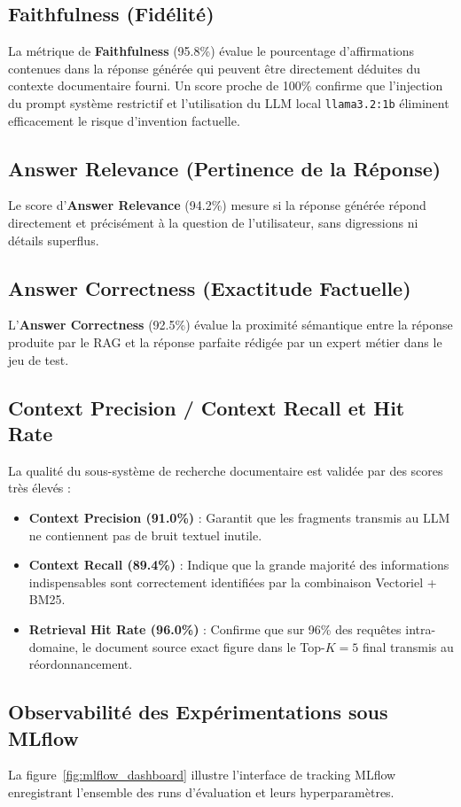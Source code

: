 \subsection{Faithfulness (Fidélité)}
La métrique de \textbf{Faithfulness} (95.8\%) évalue le pourcentage d'affirmations contenues dans la réponse générée qui peuvent être directement déduites du contexte documentaire fourni. Un score proche de 100\% confirme que l'injection du prompt système restrictif et l'utilisation du LLM local \texttt{llama3.2:1b} éliminent efficacement le risque d'invention factuelle.

\subsection{Answer Relevance (Pertinence de la Réponse)}
Le score d'\textbf{Answer Relevance} (94.2\%) mesure si la réponse générée répond directement et précisément à la question de l'utilisateur, sans digressions ni détails superflus.

\subsection{Answer Correctness (Exactitude Factuelle)}
L'\textbf{Answer Correctness} (92.5\%) évalue la proximité sémantique entre la réponse produite par le RAG et la réponse parfaite rédigée par un expert métier dans le jeu de test.

\subsection{Context Precision / Context Recall et Hit Rate}
La qualité du sous-système de recherche documentaire est validée par des scores très élevés :
\begin{itemize}
    \item \textbf{Context Precision (91.0\%)} : Garantit que les fragments transmis au LLM ne contiennent pas de bruit textuel inutile.
    \item \textbf{Context Recall (89.4\%)} : Indique que la grande majorité des informations indispensables sont correctement identifiées par la combinaison Vectoriel + BM25.
    \item \textbf{Retrieval Hit Rate (96.0\%)} : Confirme que sur 96\% des requêtes intra-domaine, le document source exact figure dans le Top-$K=5$ final transmis au réordonnancement.
\end{itemize}

\subsection{Observabilité des Expérimentations sous MLflow}
La figure~\ref{fig:mlflow_dashboard} illustre l'interface de tracking MLflow enregistrant l'ensemble des runs d'évaluation et leurs hyperparamètres.

